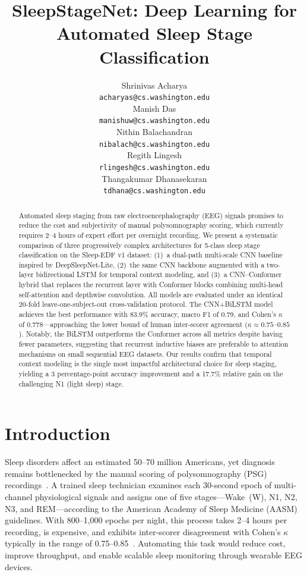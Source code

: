 \documentclass[final]{article}
\title{SleepStageNet: Deep Learning for Automated Sleep Stage Classification}
\author{%
  Shrinivas Acharya \\
  \texttt{acharyas@cs.washington.edu} \\
  \And
  Manish Das \\
  \texttt{manishuw@cs.washington.edu} \\
  \AND
  Nithin Balachandran \\
  \texttt{nibalach@cs.washington.edu} \\
  \And
  Regith Lingesh \\
  \texttt{rlingesh@cs.washington.edu} \\
  \And
  Thangakumar Dhanasekaran \\
  \texttt{tdhana@cs.washington.edu} \\
}
\begin{document}
\maketitle

\begin{abstract}
Automated sleep staging from raw electroencephalography (EEG) signals promises to reduce the cost and subjectivity of manual polysomnography scoring, which currently requires 2--4 hours of expert effort per overnight recording. We present a systematic comparison of three progressively complex architectures for 5-class sleep stage classification on the Sleep-EDF v1 dataset: (1)~a dual-path multi-scale CNN baseline inspired by DeepSleepNet-Lite, (2)~the same CNN backbone augmented with a two-layer bidirectional LSTM for temporal context modeling, and (3)~a CNN--Conformer hybrid that replaces the recurrent layer with Conformer blocks combining multi-head self-attention and depthwise convolution. All models are evaluated under an identical 20-fold leave-one-subject-out cross-validation protocol. The CNN+BiLSTM model achieves the best performance with 83.9\% accuracy, macro F1 of 0.79, and Cohen's $\kappa$ of 0.778---approaching the lower bound of human inter-scorer agreement ($\kappa \approx 0.75$--$0.85$). Notably, the BiLSTM outperforms the Conformer across all metrics despite having fewer parameters, suggesting that recurrent inductive biases are preferable to attention mechanisms on small sequential EEG datasets. Our results confirm that temporal context modeling is the single most impactful architectural choice for sleep staging, yielding a 3 percentage-point accuracy improvement and a 17.7\% relative gain on the challenging N1 (light sleep) stage.
\end{abstract}

\section{Introduction}

Sleep disorders affect an estimated 50--70 million Americans, yet diagnosis remains bottlenecked by the manual scoring of polysomnography (PSG) recordings~\cite{Berry2012}. A trained sleep technician examines each 30-second epoch of multi-channel physiological signals and assigns one of five stages---Wake~(W), N1, N2, N3, and REM---according to the American Academy of Sleep Medicine (AASM) guidelines. With 800--1,000 epochs per night, this process takes 2--4 hours per recording, is expensive, and exhibits inter-scorer disagreement with Cohen's $\kappa$ typically in the range of 0.75--0.85~\cite{Rosenberg2013}. Automating this task would reduce cost, improve throughput, and enable scalable sleep monitoring through wearable EEG devices.
\end{document}
